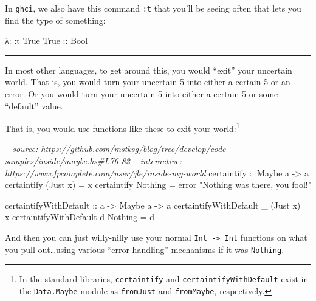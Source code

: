 \documentclass[]{article}
\newenvironment{Shaded}{}{}
\newcommand{\DataTypeTok}[1]{\textcolor[rgb]{0.56,0.13,0.00}{{#1}}}
\newcommand{\StringTok}[1]{\textcolor[rgb]{0.25,0.44,0.63}{{#1}}}
\newcommand{\CommentTok}[1]{\textcolor[rgb]{0.38,0.63,0.69}{\textit{{#1}}}}
\newcommand{\OtherTok}[1]{\textcolor[rgb]{0.00,0.44,0.13}{{#1}}}
\newcommand{\FunctionTok}[1]{\textcolor[rgb]{0.02,0.16,0.49}{{#1}}}
\newcommand{\NormalTok}[1]{{#1}}
\begin{document}
In \texttt{ghci}, we also have this command \texttt{:t} that you'll be seeing often that lets you
find the type of something:

\begin{Shaded}
\begin{Highlighting}[]
\NormalTok{λ}\FunctionTok{:} \FunctionTok{:}\NormalTok{t }\DataTypeTok{True}
\DataTypeTok{True}\OtherTok{ ::} \DataTypeTok{Bool}
\end{Highlighting}
\end{Shaded}

\begin{center}\rule{0.5\linewidth}{\linethickness}\end{center}

In most other languages, to get around this, you would ``exit'' your uncertain world. That is, you
would turn your uncertain 5 into either a certain 5 or an error. Or you would turn your uncertain 5
into either a certain 5 or some ``default'' value.

That is, you would use functions like these to exit your world:\footnote{In the standard libraries,
  \texttt{certaintify} and \texttt{certaintifyWithDefault} exist in the \texttt{Data.Maybe} module
  as \texttt{fromJust} and \texttt{fromMaybe}, respectively.}

\begin{Shaded}
\begin{Highlighting}[]
\CommentTok{-- source: https://github.com/mstksg/blog/tree/develop/code-samples/inside/maybe.hs#L76-82}
\CommentTok{-- interactive: https://www.fpcomplete.com/user/jle/inside-my-world}
\OtherTok{certaintify ::} \DataTypeTok{Maybe} \NormalTok{a }\OtherTok{->} \NormalTok{a}
\NormalTok{certaintify (}\DataTypeTok{Just} \NormalTok{x) }\FunctionTok{=} \NormalTok{x}
\NormalTok{certaintify }\DataTypeTok{Nothing}  \FunctionTok{=} \NormalTok{error }\StringTok{"Nothing was there, you fool!"}

\OtherTok{certaintifyWithDefault ::} \NormalTok{a }\OtherTok{->} \DataTypeTok{Maybe} \NormalTok{a }\OtherTok{->} \NormalTok{a}
\NormalTok{certaintifyWithDefault _ (}\DataTypeTok{Just} \NormalTok{x) }\FunctionTok{=} \NormalTok{x}
\NormalTok{certaintifyWithDefault d }\DataTypeTok{Nothing}  \FunctionTok{=} \NormalTok{d}
\end{Highlighting}
\end{Shaded}

And then you can just willy-nilly use your normal \texttt{Int\ -\textgreater{}\ Int} functions on
what you pull out\ldots{}using various ``error handling'' mechanisms if it was \texttt{Nothing}.
\end{document}
